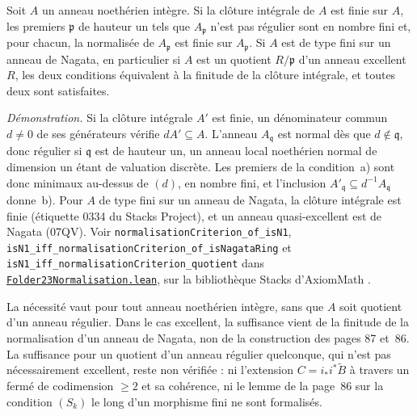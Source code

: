 \begin{encadre}
\begin{theoreme*}
Soit $A$ un anneau noethérien intègre. Si la clôture intégrale de $A$ est finie sur $A$, les premiers $\mathfrak p$ de hauteur un tels que $A_{\mathfrak p}$ n'est pas régulier sont en nombre fini et, pour chacun, la normalisée de $A_{\mathfrak p}$ est finie sur $A_{\mathfrak p}$. Si $A$ est de type fini sur un anneau de Nagata, en particulier si $A$ est un quotient $R/\mathfrak p$ d'un anneau excellent $R$, les deux conditions équivalent à la finitude de la clôture intégrale, et toutes deux sont satisfaites.
\end{theoreme*}
\end{encadre}
{\small \emph{Démonstration.} Si la clôture intégrale $A'$ est finie, un dénominateur commun $d \neq 0$ de ses générateurs vérifie $dA' \subseteq A$. L'anneau $A_{\mathfrak q}$ est normal dès que $d \notin \mathfrak q$, donc régulier si $\mathfrak q$ est de hauteur un, un anneau local noethérien normal de dimension un étant de valuation discrète. Les premiers de la condition~a) sont donc minimaux au-dessus de $(d)$, en nombre fini, et l'inclusion $A'_{\mathfrak q} \subseteq d^{-1}A_{\mathfrak q}$ donne~b). Pour $A$ de type fini sur un anneau de Nagata, la clôture intégrale est finie (étiquette 0334 du Stacks Project), et un anneau quasi-excellent est de Nagata (07QV). Voir \texttt{normalisationCriterion\_of\_isN1}, \texttt{isN1\_iff\_normalisationCriterion\_of\_isNagataRing} et \texttt{isN1\_iff\_normalisationCriterion\_quotient} dans \href{\leanblobmain/RingTheory/Folder23Normalisation.lean}{\texttt{Folder23Normalisation.\allowbreak{}lean}}, sur la bibliothèque Stacks d'AxiomMath \cite{axiomstacks}.

La nécessité vaut pour tout anneau noethérien intègre, sans que $A$ soit quotient d'un anneau régulier. Dans le cas excellent, la suffisance vient de la finitude de la normalisation d'un anneau de Nagata, non de la construction des pages 87 et~86. La suffisance pour un quotient d'un anneau régulier quelconque, qui n'est pas nécessairement excellent, reste non vérifiée : ni l'extension $C = i_*i^*\tilde B$ à travers un fermé de codimension $\geq 2$ et sa cohérence, ni le lemme de la page~86 sur la condition $(S_k)$ le long d'un morphisme fini ne sont formalisés.\par}

